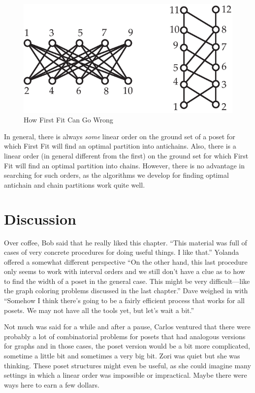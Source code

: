 \begin{figure}
\begin{center}
\includegraphics*[scale=.4]{posets-figs/FirstFit.pdf}
\caption{How First Fit Can Go Wrong}
\label{fig:FirstFit} 
\end{center}
\end{figure}

In general, there is always \textit{some} linear order on the ground set 
of a poset for which First Fit will find an optimal partition into antichains.  
Also, there is a linear order (in general different from the first) on the ground 
set for which First Fit will find an optimal partition into chains.
However, there is no advantage in searching for such orders, as the algorithms
we develop for finding optimal antichain and chain partitions work quite well.

\section{Discussion}

Over coffee, Bob said that he really liked this chapter.  ``This
material was full of cases of very concrete procedures for doing
useful things.  I like that.''  Yolanda offered a somewhat different
perspective ``On the other hand, this last procedure only seems
to work with interval orders and we still don't have a clue as to
how to find the width of a poset in the general case.  This might
be very difficult---like the graph coloring problems discussed in
the last chapter.''  Dave weighed in with ``Somehow I think there's
going to be a fairly efficient process that works for all posets.
We may not have all the tools yet, but let's wait a bit.''

Not much was said for a while and after a pause, Carlos ventured
that there were probably a lot of combinatorial problems for
posets that had analogous versions for graphs and in those cases,
the poset version would be a bit more complicated, sometime a little
bit and sometimes a very big bit.
Zori was quiet but she was thinking.  These poset structures might
even be useful, as she could imagine many settings in which a
linear order was impossible or impractical.  Maybe there were ways
here to earn a few dollars.


